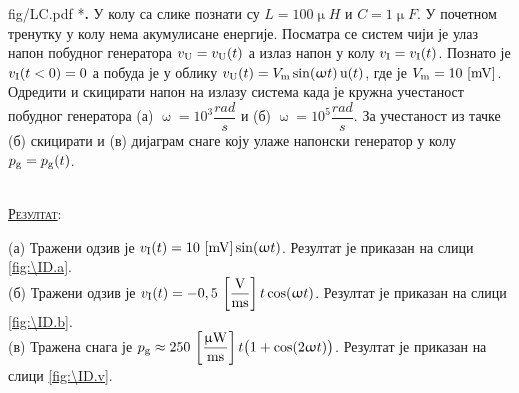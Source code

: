 \begin{slikaDesno}{fig/LC.pdf}
{\color{red}*}\textbf{\ID.}  У колу са слике познати су 
$L = 100\unit{\upmu H}$ и $C = 1\unit{\upmu F}$.
У почетном тренутку у колу нема 
акумулисане енергије. Посматра
се систем чији је улаз напон побудног генератора $v_{\rm U} = v_{\rm U}(t)$ а излаз напон у колу 
$v_{\rm I} = v_{\rm I}(t)$. 
Познато је $v_{\rm I}(t < 0) = 0$ а побуда
је у облику $v_{\rm U}(t) = V_{\rm m} 
\sin(\upomega t)\,{\rm u}(t)$, где је 
$V_{\rm m} = 10\,\left[\mathrm{mV}\right]$. Одредити 
и скицирати напон на 
излазу система када је кружна учестаност 
побудног генератора (а) $\upomega = 10^3 
\unit{\dfrac{rad}{s}}$ и (б) 
$\upomega = 10^5 
\unit{\dfrac{rad}{s}}$. За учестаност из 
тачке (б) скицирати и (в) дијаграм снаге 
коју улаже напонски генератор у колу
$p_{\rm g} =p_{\rm g}(t)$.
\end{slikaDesno}\\

\textsc{\underline{Резултат}}:

(а) Тражени одзив је $v_{\rm I}(t) = 10\,\left[\mathrm{mV}\right] \sin(\upomega t)$. 
Резултат је приказан на слици \ref{fig:\ID.a}.\\[2mm]

(б) Тражени одзив је $v_{\rm I}(t) = -0,5\,\left[\mathrm{\dfrac{V}{ms}}\right] t \cos(\upomega t)$.
Резултат је приказан на слици \ref{fig:\ID.b}.\\[2mm]

(в) Тражена снага је $p_{\rm g} \approx 250\,\left[\mathrm{\dfrac{\upmu W}{ms}}\right] t
\bigl(1 + \cos(2\upomega t) \bigr)$.
Резултат је приказан на слици \ref{fig:\ID.v}. \\

